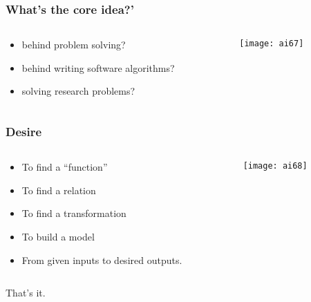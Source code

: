 \begin{frame}[fragile]\frametitle{What's the core idea?'}


\begin{columns}
    \begin{column}[T]{0.6\linewidth}

\begin{itemize}
\item behind problem solving?
\item behind writing software algorithms?
\item solving research problems?
\end{itemize}

    \end{column}
    \begin{column}[T]{0.4\linewidth}

			\begin{center}
			\texttt{[image: ai67]}
			\end{center}
			
    \end{column}
  \end{columns}
\end{frame}

\begin{frame}[fragile]\frametitle{Desire}

\begin{columns}
    \begin{column}[T]{0.6\linewidth}

\begin{itemize}
\item To find a ``function''
\item To find a relation
\item To find a transformation
\item To build a model
\item From given inputs to desired outputs.
\end{itemize}

    \end{column}
    \begin{column}[T]{0.4\linewidth}

			\begin{center}
			\texttt{[image: ai68]}
			\end{center}
			
    \end{column}
  \end{columns}
  
That's it.
\end{frame}


